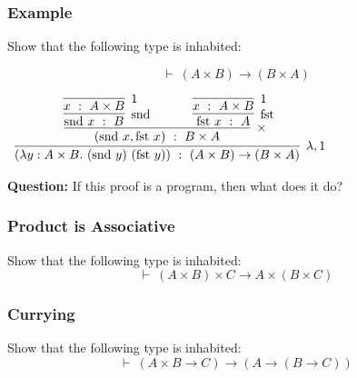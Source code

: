 \documentclass{beamer}
\theoremstyle{indentDefn} \newtheorem{defn}[]{Definition}
\begin{document}



\begin{frame}
  \frametitle{Example}

  Show that the following type is inhabited:

  $$ \vdash \ (A \times B) \to (B \times A)$$

  \vspace{0.5cm}

  \begin{center}
    $\begin{array}{c}
      \infer[\lambda, 1]{(\lambda y : A\times B. \ (\snd y) \ (\fst y)) \ : \ (A\times B)\to(B \times A)}
        {\infer[\times]{(\snd x, \fst x) \ : \ B \times A}
          {\infer[\snd]{\snd x \ : \ B}{\infer[1]{x \ : \ A\times B}{}} \quad & \quad \infer[\fst]{\fst x \ : \ A}{\infer[1]{x \ : \ A\times B}{}}}}
    \end{array}$
  \end{center}

  \vspace{5mm}

  {\bf Question:} If this proof is a program, then what does it do? 

  \vspace{30mm}

\end{frame}

\begin{frame}
  \frametitle{Product is Associative}

  Show that the following type is inhabited:
  $$ \vdash \ (A \times B) \times C \to A \times (B \times C)$$

  \vspace{70mm}


\end{frame}

\begin{frame}
  \frametitle{Currying}

  Show that the following type is inhabited:
  $$ \vdash \ (A \times B \to C) \to (A \to (B \to C))$$

  \vspace{70mm}


\end{frame}
\end{document}
